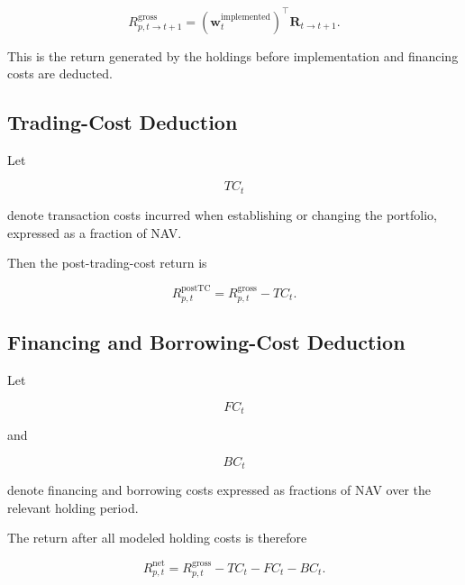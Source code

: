 \documentclass[11pt,a4paper]{article}
\begin{document}
\begin{equation}
\boxed{
R_{p,t\rightarrow t+1}^{\mathrm{gross}}
=
\left(
\mathbf{w}_t^{\mathrm{implemented}}
\right)^\top
\mathbf{R}_{t\rightarrow t+1}.
}
\end{equation}

This is the return generated by the holdings before implementation and financing
costs are deducted.


\subsection{Trading-Cost Deduction}

Let

\begin{equation}
TC_t
\end{equation}

denote transaction costs incurred when establishing or changing the portfolio,
expressed as a fraction of NAV.

Then the post-trading-cost return is

\begin{equation}
\boxed{
R_{p,t}^{\mathrm{postTC}}
=
R_{p,t}^{\mathrm{gross}}
-
TC_t.
}
\end{equation}


\subsection{Financing and Borrowing-Cost Deduction}

Let

\begin{equation}
FC_t
\end{equation}

and

\begin{equation}
BC_t
\end{equation}

denote financing and borrowing costs expressed as fractions of NAV over the
relevant holding period.

The return after all modeled holding costs is therefore

\begin{equation}
\boxed{
R_{p,t}^{\mathrm{net}}
=
R_{p,t}^{\mathrm{gross}}
-
TC_t
-
FC_t
-
BC_t.
}
\end{equation}
\end{document}
